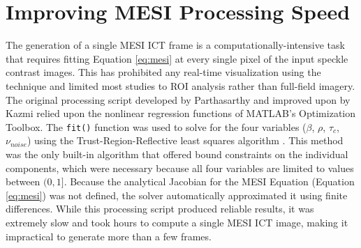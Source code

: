 \section{Improving MESI Processing Speed} \label{sec:mesi_fit}

The generation of a single MESI ICT frame is a computationally-intensive task that requires fitting Equation \ref{eq:mesi} at every single pixel of the input speckle contrast images. This has prohibited any real-time visualization using the technique and limited most studies to ROI analysis rather than full-field imagery. The original processing script developed by Parthasarthy \cite{Parthasarthy:2010uf} and improved upon by Kazmi \cite{Kazmi:2014vi} relied upon the nonlinear regression functions of MATLAB’s Optimization Toolbox. The \texttt{fit()} function was used to solve for the four variables ($\beta$, $\rho$, $\tau_c$, $\nu_{noise}$) using the Trust-Region-Reflective least squares algorithm \cite{Yuan:1999tk}. This method was the only built-in algorithm that offered bound constraints on the individual components, which were necessary because all four variables are limited to values between $(0,1]$. Because the analytical Jacobian for the MESI Equation (Equation \ref{eq:mesi}) was not defined, the solver automatically approximated it using finite differences. While this processing script produced reliable results, it was extremely slow and took hours to compute a single MESI ICT image, making it impractical to generate more than a few frames.

\begin{table}
    \caption[Comparison of MESI processing speeds]{
        Comparison of processing speeds on a 1194 x 994 pixel MESI frame.
    }
    \label{tab:mesispeed}
    \centering
\end{table}

